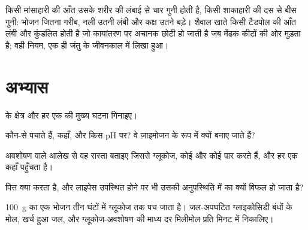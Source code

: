 \begin{remark}[किसी आँत की लंबाई]\label{rem:b1:digestion-absorption:length}
किसी मांसाहारी की आँत उसके शरीर की लंबाई से चार गुनी होती है, किसी
शाकाहारी की दस से बीस गुनी: भोजन जितना गरीब, नली उतनी लंबी और कक्ष उतने
बड़े। शैवाल खाते किसी टैडपोल की आँत लंबी और कुंडलित होती है जो कायांतरण
पर अचानक छोटी हो जाती है जब मेंढक कीटों की ओर मुड़ता है; वही नियम, एक ही
जंतु के जीवनकाल में लिखा हुआ।
\end{remark}

\section{अभ्यास}

\begin{exercise}[$\star$]\label{exo:b1:digestion-absorption:1}
 के क्षेत्र और हर एक की मुख्य घटना गिनाइए।
\end{exercise}

\begin{exercise}[$\star$]\label{exo:b1:digestion-absorption:2}
कौन-से   पचाते हैं, कहाँ, और किस pH पर? वे ज़ाइमोजन के रूप
में क्यों बनाए जाते हैं?
\end{exercise}

\begin{exercise}[$\star$]\label{exo:b1:digestion-absorption:3}
अवशोषण वाले आलेख से वह रास्ता बताइए जिससे ग्लूकोज, कोई  और कोई
  पार करते हैं, और हर एक कहाँ पहुँचता है।
\end{exercise}

\begin{exercise}[$\star$]\label{exo:b1:digestion-absorption:4}
पित्त क्या करता है, और लाइपेस उपस्थित होने पर भी उसकी अनुपस्थिति में 
का  क्यों विफल हो जाता है?
\end{exercise}

\begin{exercise}[$\star\star$]\label{exo:b1:digestion-absorption:5}
\qty{100}{g}  का एक भोजन तीन घंटों में ग्लूकोज तक पच जाता है।
जल-अपघटित ग्लाइकोसिडी बंधों के मोल, खर्च हुआ जल, और ग्लूकोज-अवशोषण की
माध्य दर मिलीमोल प्रति मिनट में निकालिए।
\end{exercise}

